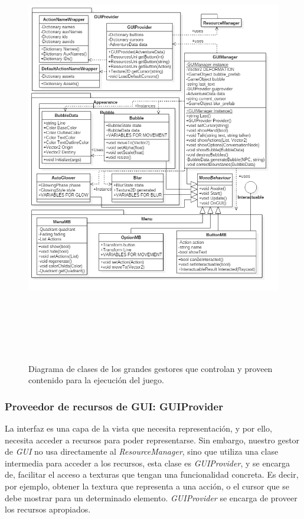 \begin{figure}[h!]
	\centerline{\includegraphics[height=7.5in]{figures/it2/GUIManager.png}}
	\caption[GameLogic Grandes Gestores - Versión Final]{Diagrama de clases de los grandes gestores que controlan y proveen contenido para la ejecución del juego.}
	\label{guimanagerit2}
\end{figure}

\newpage

\subsubsection{Proveedor de recursos de GUI: GUIProvider}

La interfaz es una capa de la vista que necesita representación, y por ello, necesita acceder a recursos para poder representarse. Sin embargo, nuestro gestor de \textit{GUI} no usa directamente al \textit{ResourceManager}, sino que utiliza una clase intermedia para acceder a los recursos, esta clase es \textit{GUIProvider}, y se encarga de, facilitar el acceso a texturas que tengan una funcionalidad concreta. Es decir, por ejemplo, obtener la textura que representa a una acción, o el cursor que se debe mostrar para un determinado elemento. \textit{GUIProvider} se encarga de proveer los recursos apropiados.

